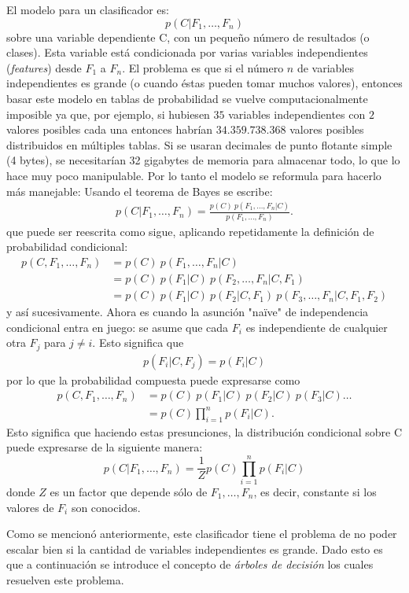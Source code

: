 	El modelo para un clasificador es:
		$$p(C \vert F_1,\dots,F_n)$$
	sobre una variable dependiente C, con un pequeño número de resultados (o clases). Esta variable está condicionada por varias variables independientes (\textit{features}) desde $F_1$ a $F_n$. El problema es que si el número $n$ de variables independientes es grande (o cuando éstas pueden tomar muchos valores), entonces basar este modelo en tablas de probabilidad se vuelve computacionalmente imposible ya que, por ejemplo, si hubiesen $35$ variables independientes con $2$ valores posibles cada una entonces habrían $34.359.738.368$ valores posibles distribuidos en múltiples tablas. Si se usaran decimales de punto flotante simple (4 bytes), se necesitarían 32 gigabytes de memoria para almacenar todo, lo que lo hace muy poco manipulable. Por lo tanto el modelo se reformula para hacerlo más manejable:
Usando el teorema de Bayes se escribe:
		\begin{align*}
		p(C \vert F_1,\dots,F_n) = \frac{p(C) \ p(F_1,\dots,F_n\vert C)}{p(F_1,\dots,F_n)}.
		\end{align*}
		que puede ser reescrita como sigue, aplicando repetidamente la definición de probabilidad condicional:
		\begin{align}
		p(C, F_1, \dots, F_n)
		&= p(C) \ p(F_1,\dots,F_n\vert C) \\
		&= p(C) \ p(F_1\vert C) \ p(F_2,\dots,F_n\vert C, F_1) \\
		&= p(C) \ p(F_1\vert C) \ p(F_2\vert C, F_1) \ p(F_3,\dots,F_n\vert C, F_1, F_2)
		\end{align}
		y así sucesivamente. Ahora es cuando la asunción "na\"{i}ve" de independencia condicional entra en juego: se asume que cada $F_i$ es independiente de cualquier otra $F_j$ para $j \neq i$. Esto significa que
		\begin{align*}
		p(F_i \vert C, F_j) = p(F_i \vert C)
		\end{align*}
		por lo que la probabilidad compuesta puede expresarse como
		\begin{align*}
		p(C, F_1, \dots, F_n) 
		&= p(C) \ p(F_1\vert C) \ p(F_2\vert C) \ p(F_3\vert C) \dots \\
		&= p(C) \prod_{i=1}^n p(F_i \vert C).
		\end{align*}
		Esto significa que haciendo estas presunciones, la distribución condicional sobre C puede expresarse de la siguiente manera:
		$$p(C \vert F_1,\dots,F_n) = \frac{1}{Z}p(C)\prod_{i=1}^n p(F_i \vert C)$$
		donde $Z$ es un factor que depende sólo de $F_1,\dots , F_n$, es decir, constante si los valores de $F_i$ son conocidos.
		
		Como se mencionó anteriormente, este clasificador tiene el problema de no poder escalar bien si la cantidad de variables independientes es grande. Dado esto es que a continuación se introduce el concepto de \textit{árboles de decisión} los cuales resuelven este problema.
		